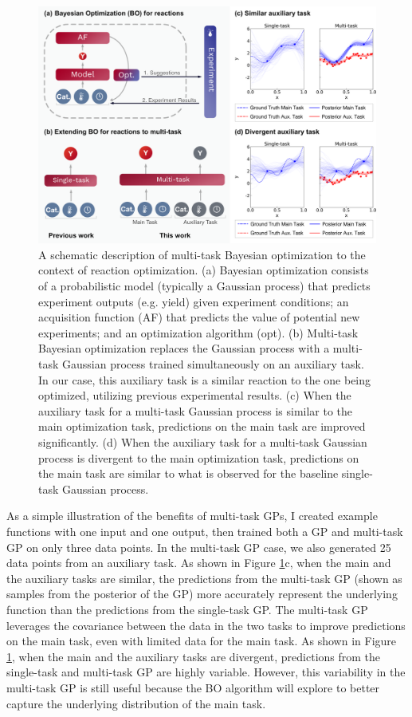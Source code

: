 \begin{figure}
    \centering
    \includegraphics[width=1.2\textwidth]{gfx/Chapter04/paper_figure_1.png}
    \caption{A schematic description of multi-task Bayesian optimization to the context of reaction optimization. (a) Bayesian optimization consists of a probabilistic model (typically a Gaussian process) that predicts experiment outputs (e.g. yield) given experiment conditions; an acquisition function (AF) that predicts the value of potential new experiments; and an optimization algorithm (opt). (b) Multi-task Bayesian optimization replaces the Gaussian process with a multi-task Gaussian process trained simultaneously on an auxiliary task. In our case, this auxiliary task is a similar reaction to the one being optimized, utilizing previous experimental results. (c) When the auxiliary task for a multi-task Gaussian process is similar to the main optimization task, predictions on the main task are improved significantly. (d) When the auxiliary task for a multi-task Gaussian process is divergent to the main optimization task, predictions on the main task are similar to what is observed for the baseline single-task Gaussian process.}
    \label{fig:multitask_overview}
\end{figure}

As a simple illustration of the benefits of multi-task GPs, I created example functions with one input and one output, then trained both a GP and multi-task GP on only three data points. In the multi-task GP case, we also generated 25 data points from an auxiliary task. As shown in Figure \ref{fig:multitask_overview}c, when the main and the auxiliary tasks are similar, the predictions from the multi-task GP (shown as samples from the posterior of the GP) more accurately represent the underlying function than the predictions from the single-task GP. The multi-task GP leverages the covariance between the data in the two tasks to improve predictions on the main task, even with limited data for the main task. As shown in Figure \ref{fig:multitask_overview}, when the main and the auxiliary tasks are divergent, predictions from the single-task and multi-task GP are highly variable. However, this variability in the multi-task GP is still useful because the BO algorithm will explore to better capture the underlying distribution of the main task.

